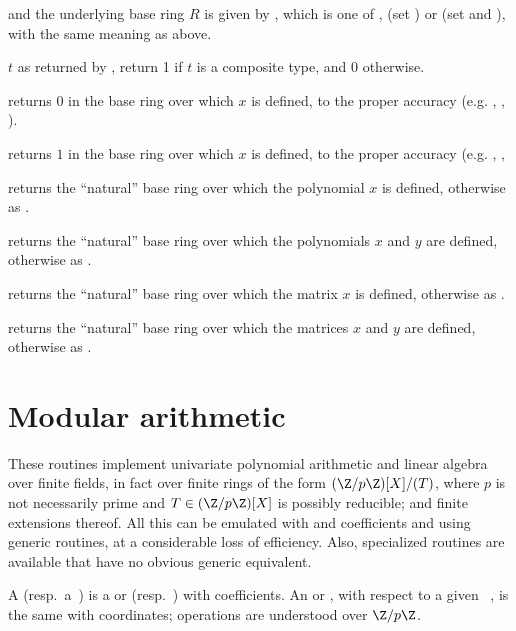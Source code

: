 and the underlying base ring $R$ is given by , which
is one of ,  (set ) or 
(set  and ), with the same meaning
as above.

 $t$ as returned by ,
return 1 if $t$ is a composite type, and 0 otherwise.

 returns $0$ in the base ring over which $x$
is defined, to the proper accuracy (e.g. , ,
).

 returns $1$ in the base ring over which $x$
is defined, to the proper accuracy (e.g. , ,

 returns
the ``natural'' base ring over which the polynomial $x$ is defined,
otherwise as .

 returns
the ``natural'' base ring over which the polynomials $x$ and $y$ are defined,
otherwise as .

 returns
the ``natural'' base ring over which the matrix $x$ is defined,
otherwise as .

 returns
the ``natural'' base ring over which the matrices $x$ and $y$ are defined,
otherwise as .

\section{Modular arithmetic}

\noindent These routines implement univariate polynomial arithmetic and
linear algebra over finite fields, in fact over finite rings of the form
$(\Z/p\Z)[X]/(T)$, where $p$ is not necessarily prime and $T\in(\Z/p\Z)[X]$ is
possibly reducible; and finite extensions thereof. All this can be emulated
with  and  coefficients and using generic routines,
at a considerable loss of efficiency. Also, specialized routines are
available that have no obvious generic equivalent.

 A 
(resp.~a~) is a  or  (resp.~) with
 coefficients. An  or , with respect to a given
~, is the same with  coordinates; operations are
understood over $\Z/p\Z$.

